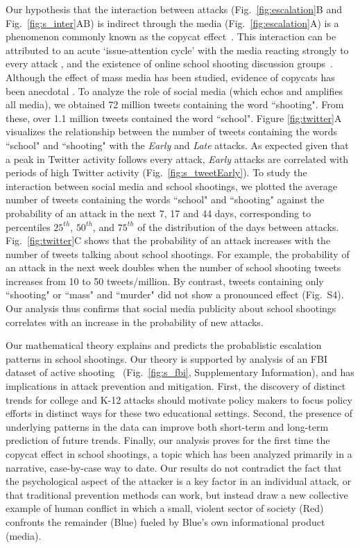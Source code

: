 Our hypothesis that the interaction between attacks
(Fig.~\ref{fig:escalation}B and Fig.~\ref{fig:s_inter}AB) is indirect
through the media (Fig.~\ref{fig:escalation}A) is a phenomenon
commonly known as the copycat effect~\cite{Coleman2004}. This
interaction can be attributed to an acute `issue-attention cycle'
\cite{downs1972up} with the media reacting strongly to every attack
\cite{Rocque2012}, and the existence of online school shooting
discussion groups~\cite{Oksanen2014}. Although the effect of mass
media has been studied, evidence of copycats has been anecdotal
\cite{O2000}. To analyze the role of social media (which echos and
amplifies all media), we obtained 72 million tweets containing the
word ``shooting". From these, over 1.1 million tweets contained the
word ``school". Figure \ref{fig:twitter}A visualizes the relationship
between the number of tweets containing the words ``school" and
``shooting" with the \textit{Early} and \textit{Late} attacks. As
expected given that a peak in Twitter activity follows every attack,
\textit{Early} attacks are correlated with periods of high Twitter
activity (Fig.~\ref{fig:s_tweetEarly}). To study the interaction
between social media and school shootings, we plotted the average
number of tweets containing the words ``school" and ``shooting"
against the probability of an attack in the next 7, 17 and 44 days,
corresponding to percentiles $25^{th}$, $50^{th}$, and $75^{th}$ of
the distribution of the days between attacks. 
Fig.~\ref{fig:twitter}C shows that the probability of an attack
increases with the number of tweets talking about school shootings. 
For example, the probability of an attack in the next week doubles
when the number of school shooting tweets increases from 10 to 50
tweets/million.
By contrast, tweets containing only ``shooting" or ``mass" and
``murder" did not show a pronounced effect (Fig.~S4). 
Our analysis thus confirms that social media publicity about school
shootings correlates with an increase in the probability of new
attacks.


Our mathematical theory explains and predicts the probablistic
escalation patterns in school shootings. Our theory is supported by
analysis of an FBI dataset of active shooting~\cite{FBI}
(Fig.~\ref{fig:s_fbi}, Supplementary Information), and has
implications in attack prevention and mitigation. First, the discovery
of distinct trends for college and K-12 attacks should motivate policy
makers to focus policy efforts in distinct ways for these two
educational settings. Second, the presence of underlying patterns in
the data can improve both short-term and long-term prediction of
future trends. Finally, our analysis proves for the first time the
copycat effect in school shootings, a topic which has been analyzed
primarily in a narrative, case-by-case way to date. Our results do not
contradict the fact that the psychological aspect of the attacker is a
key factor in an individual attack, or that traditional prevention
methods can work, but instead draw a new collective example of human
conflict in which a small, violent sector of society (Red) confronts
the remainder (Blue) fueled by Blue's own informational product
(media). 







